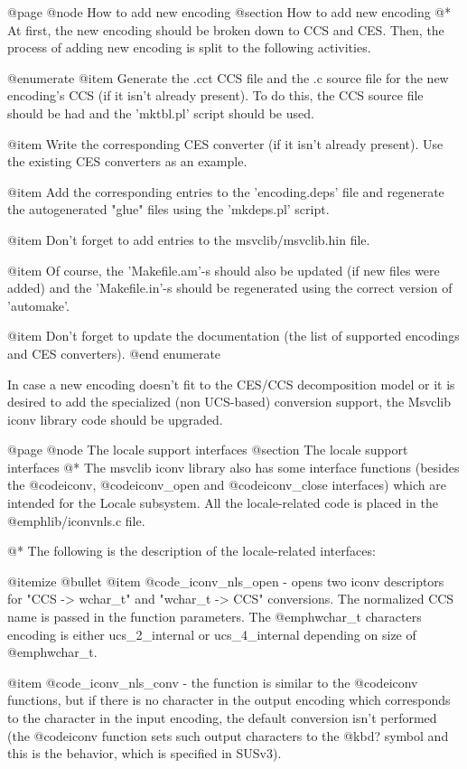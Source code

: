 @page
@node How to add new encoding
@section How to add new encoding
@*
At first, the new encoding should be broken down to CCS and CES. Then,
the process of adding new encoding is split to the following activities.

@enumerate
@item Generate the .cct CCS file and the .c source file for the new
encoding's CCS (if it isn't already present). To do this, the CCS source
file should be had and the 'mktbl.pl' script should be used.

@item Write the corresponding CES converter (if it isn't already
present). Use the existing CES converters as an example.

@item
Add the corresponding entries to the 'encoding.deps' file and regenerate
the autogenerated "glue" files using the 'mkdeps.pl' script.

@item
Don't forget to add entries to the msvclib/msvclib.hin file.

@item
Of course, the 'Makefile.am'-s should also be updated (if new files were
added) and the 'Makefile.in'-s should be regenerated using the correct
version of 'automake'.

@item
Don't forget to update the documentation (the list of
supported encodings and CES converters).
@end enumerate

In case a new encoding doesn't fit to the CES/CCS decomposition model or
it is desired to add the specialized (non UCS-based) conversion support,
the Msvclib iconv library code should be upgraded.





@page
@node The locale support interfaces
@section The locale support interfaces
@*
The msvclib iconv library also has some interface functions (besides the
@code{iconv}, @code{iconv_open} and @code{iconv_close} interfaces) which
are intended for the Locale subsystem. All the locale-related code is
placed in the @emph{lib/iconvnls.c} file.

@*
The following is the description of the locale-related interfaces:

@itemize @bullet
@item
@code{_iconv_nls_open} - opens two iconv descriptors for "CCS ->
wchar_t" and "wchar_t -> CCS" conversions. The normalized CCS name is
passed in the function parameters. The @emph{wchar_t} characters encoding is
either ucs_2_internal or ucs_4_internal depending on size of
@emph{wchar_t}.

@item
@code{_iconv_nls_conv} - the function is similar to the @code{iconv}
functions, but if there is no character in the output encoding which
corresponds to the character in the input encoding, the default
conversion isn't performed (the @code{iconv} function sets such output
characters to the @kbd{?} symbol and this is the behavior, which is
specified in SUSv3).

